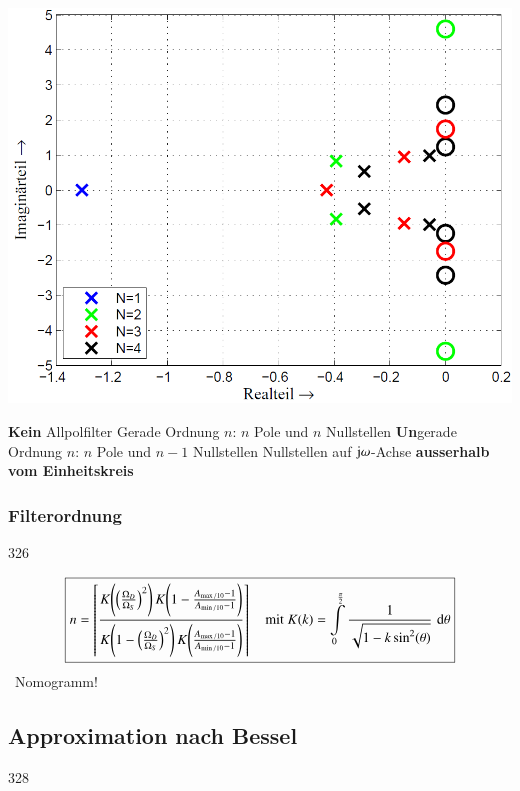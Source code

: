 \begin{minipage}[c]{0.4\columnwidth}
    \includegraphics[width=\columnwidth]{images/filter_cauer_pollage.png}
\end{minipage}
\hfill
\begin{minipage}[c]{0.58\columnwidth}
    \begin{outline}
        \1 \textbf{Kein} Allpolfilter
            \2 Gerade Ordnung $n$: $n$ Pole und $n$ Nullstellen
            \2 \textbf{Un}gerade Ordnung $n$: $n$ Pole und $n-1$ Nullstellen
        \1 Nullstellen auf $\mathrm{j} \omega$-Achse \textbf{ausserhalb vom Einheitskreis}
    \end{outline}
\end{minipage}


\subsubsection{Filterordnung}{326}

$$ \boxed{ n = \left\lceil \frac{ K \Bigg( \Big( \frac{\Omega_D}{\Omega_S} \Big)^2 \Bigg) \, K \Bigg( 1 - \frac{A_{\max / 10} - 1}{A_{\min / 10} - 1} \Bigg) }
    { K \Bigg( 1 -\Big( \frac{\Omega_D}{\Omega_S} \Big)^2 \Bigg) \, K \Bigg(\frac{A_{\max / 10} - 1}{A_{\min / 10} - 1} \Bigg) }  \right\rceil 
    \quad \text{mit } K(k) = \int\limits_{0}^{\frac{\pi}{2} }  \frac{1}{\sqrt{1- k \sin^2(\theta)}} \, \mathop{} \! \mathrm{d} \theta }$$
    \textrightarrow\ Nomogramm!


\subsection{Approximation nach Bessel}{328}

